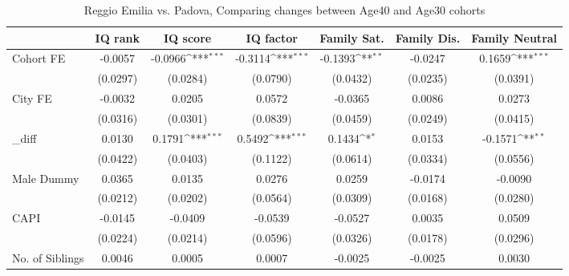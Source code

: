 \begin{table}[htbp]\centering
\def\sym#1{\ifmmode^{#1}\else\(^{#1}\)\fi}
\caption{Reggio Emilia vs. Padova, Comparing changes between Age40 and Age30 cohorts}
\begin{tabular}{l*{6}{c}}
\toprule
            &\multicolumn{1}{c}{IQ rank}&\multicolumn{1}{c}{IQ score}&\multicolumn{1}{c}{IQ factor}&\multicolumn{1}{c}{Family Sat.}&\multicolumn{1}{c}{Family Dis.}&\multicolumn{1}{c}{Family Neutral}\\
\midrule
Cohort FE   &     -0.0057         &     -0.0966\sym{***}&     -0.3114\sym{***}&     -0.1393\sym{**} &     -0.0247         &      0.1659\sym{***}\\
            &    (0.0297)         &    (0.0284)         &    (0.0790)         &    (0.0432)         &    (0.0235)         &    (0.0391)         \\
\addlinespace
City FE     &     -0.0032         &      0.0205         &      0.0572         &     -0.0365         &      0.0086         &      0.0273         \\
            &    (0.0316)         &    (0.0301)         &    (0.0839)         &    (0.0459)         &    (0.0249)         &    (0.0415)         \\
\addlinespace
\_diff       &      0.0130         &      0.1791\sym{***}&      0.5492\sym{***}&      0.1434\sym{*}  &      0.0153         &     -0.1571\sym{**} \\
            &    (0.0422)         &    (0.0403)         &    (0.1122)         &    (0.0614)         &    (0.0334)         &    (0.0556)         \\
\addlinespace
Male Dummy  &      0.0365         &      0.0135         &      0.0276         &      0.0259         &     -0.0174         &     -0.0090         \\
            &    (0.0212)         &    (0.0202)         &    (0.0564)         &    (0.0309)         &    (0.0168)         &    (0.0280)         \\
\addlinespace
CAPI        &     -0.0145         &     -0.0409         &     -0.0539         &     -0.0527         &      0.0035         &      0.0509         \\
            &    (0.0224)         &    (0.0214)         &    (0.0596)         &    (0.0326)         &    (0.0178)         &    (0.0296)         \\
\addlinespace
No. of Siblings&      0.0046         &      0.0005         &      0.0007         &     -0.0025         &     -0.0025         &      0.0030         \\

\end{tabular}
\end{table}
